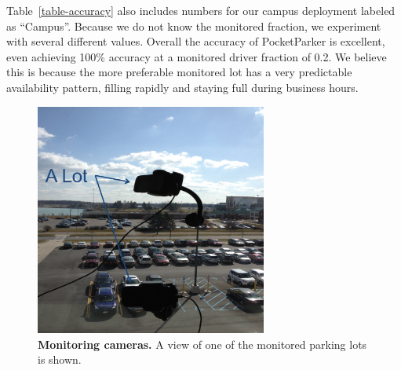 Table~\ref{table-accuracy} also includes numbers for our campus deployment
labeled as ``Campus''. Because we do not know the monitored fraction, we
experiment with several different values. Overall the accuracy of
PocketParker is excellent, even achieving 100\% accuracy at a monitored
driver fraction of 0.2. We believe this is because the more preferable
monitored lot has a very predictable availability pattern, filling rapidly
and staying full during business hours.

\begin{figure}[t]
\centering
\includegraphics[width=3.0in]{./figures/Camera_setting.pdf}

\caption{\textbf{Monitoring cameras.} A view of one of the monitored parking
lots is shown.}

\label{fig-camera}
\end{figure}
